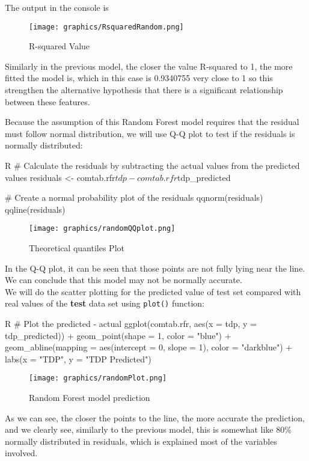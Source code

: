 The output in the console is
\begin{figure}[H]
    \centering
    \texttt{[image: graphics/RsquaredRandom.png]}
    \caption{R-squared Value}
    \label{fig:RSV}
\end{figure}

Similarly in the previous model, the closer the value R-squared to 1, the more fitted the model is, which in this case is 0.9340755 very close to 1 so this strengthen the alternative hypothesis that there is a significant relationship between these features.

Because the assumption of this Random Forest model requires that the residual must follow normal distribution, we will use Q-Q plot to test if the residuals is normally distributed:
\begin{code}{R}
# Calculate the residuals by subtracting the actual values from the predicted values
residuals <- comtab.rfr$tdp - comtab.rfr$tdp_predicted

# Create a normal probability plot of the residuals
qqnorm(residuals)
qqline(residuals)
\end{code}
\begin{figure}[H]
    \centering
    \texttt{[image: graphics/randomQQplot.png]}
    \caption{Theoretical quantiles Plot}
    \label{fig:QQ}
\end{figure}

In the Q-Q plot, it can be seen that those points are not fully lying near the line. We can conclude that this model may not be normally accurate.\\

We will do the scatter plotting for the predicted value of test set compared with real values of the \textbf{test} data set using \verb|plot()| function:
\begin{code}{R}
# Plot the predicted - actual
ggplot(comtab.rfr, aes(x = tdp, y = tdp_predicted)) +
  geom_point(shape = 1, color = "blue") +
  geom_abline(mapping = aes(intercept = 0, slope = 1), color = "darkblue") +
  labs(x = "TDP", y = "TDP Predicted")
\end{code}
\begin{figure}[H]
    \centering
    \texttt{[image: graphics/randomPlot.png]}
    \caption{Random Forest model prediction}
    \label{fig:random_trend}
\end{figure}

As we can see, the closer the points to the line, the more accurate the prediction, and we clearly see, similarly to the previous model, this is somewhat like $80\%$ normally distributed in residuals, which is explained most of the variables involved.

